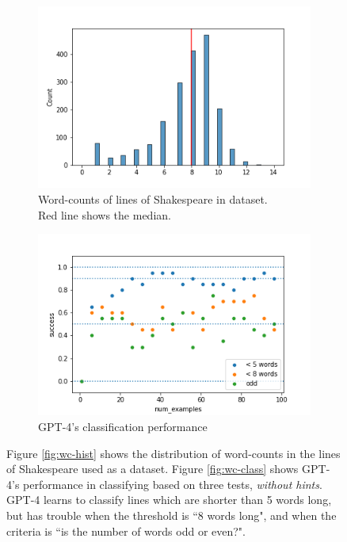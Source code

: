 \documentclass[a4paper, 11pt]{article}
\begin{document}
\begin{figure}
\centering
\begin{subfigure}{0.49\textwidth}
    \includegraphics[width=\textwidth]{images/comedy-of-errors-lines-wordcount-histogram.png}
    \captionsetup{justification=centering}
    \caption{
    	Word-counts of lines of Shakespeare in dataset.\\
    	Red line shows the median.
    	}
    \label{fig:wc-hist}
\end{subfigure}
\hfill
\begin{subfigure}{0.49\textwidth}
    \includegraphics[width=\textwidth]{images/wordcount-classification.png}
    \caption{GPT-4's classification performance}
    \label{fig:wc-class}
\end{subfigure}
\caption{
Figure \eqref{fig:wc-hist} shows the distribution of word-counts in the lines of Shakespeare used as a dataset.
Figure \eqref{fig:wc-class} shows GPT-4's performance in classifying based on three tests, \emph{without hints}. GPT-4 learns to classify lines which are shorter than 5 words long, but has trouble when the threshold is ``8 words long", and when the criteria is ``is the number of words odd or even?".
}
\end{figure}
\end{document}
